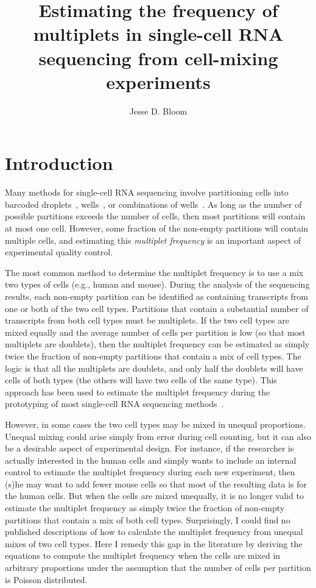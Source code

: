 \documentclass[fleqn,10pt]{wlpeerj} %
\title{Estimating the frequency of multiplets in single-cell RNA sequencing from cell-mixing experiments}
\author[1]{Jesse D. Bloom}
\affil[1]{Fred Hutch Cancer Research Center, Seattle, WA  98109}
\begin{document}
\flushbottom
\maketitle
\thispagestyle{empty}

\section*{Introduction}

Many methods for single-cell RNA sequencing involve partitioning cells into barcoded droplets~\citep{klein2015droplet,macosko2015highly,zheng2017massively}, wells~\citep{gierahn2017seq}, or combinations of wells~\citep{cao2017comprehensive}.
As long as the number of possible partitions exceeds the number of cells, then most partitions will contain at most one cell.
However, some fraction of the non-empty partitions will contain multiple cells, and estimating this \emph{multiplet frequency} is an important aspect of experimental quality control.

The most common method to determine the multiplet frequency is to use a mix two types of cells (e.g., human and mouse).
During the analysis of the sequencing results, each non-empty partition can be identified as containing transcripts from one or both of the two cell types.
Partitions that contain a substantial number of transcripts from both cell types must be multiplets.
If the two cell types are mixed equally and the average number of cells per partition is low (so that most multiplets are doublets), then the multiplet frequency can be estimated as simply twice the fraction of non-empty partitions that contain a mix of cell types.
The logic is that all the multiplets are doublets, and only half the doublets will have cells of both types (the others will have two cells of the same type).
This approach has been used to estimate the multiplet frequency during the prototyping of most single-cell RNA sequencing methods~\citep{klein2015droplet,macosko2015highly,zheng2017massively,gierahn2017seq,cao2017comprehensive}.

However, in some cases the two cell types may be mixed in unequal proportions.
Unequal mixing could arise simply from error during cell counting, but it can also be a desirable aspect of experimental design.
For instance, if the researcher is actually interested in the human cells and simply wants to include an internal control to estimate the multiplet frequency during each new experiment, then (s)he may want to add fewer mouse cells so that most of the resulting data is for the human cells.
But when the cells are mixed unequally, it is no longer valid to estimate the multiplet frequency as simply twice the fraction of non-empty partitions that contain a mix of both cell types.
Surprisingly, I could find no published descriptions of how to calculate the multiplet frequency from unequal mixes of two cell types.
Here I remedy this gap in the literature by deriving the equations to compute the multiplet frequency when the cells are mixed in arbitrary proportions under the assumption that the number of cells per partition is Poisson distributed.
\end{document}
